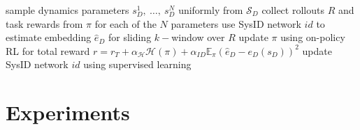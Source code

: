 \documentclass{article}
\newcommand{\E}{\mathbb{E}}
\newcommand{\TODO}[1]{}
\newcommand{\cA}{\mathcal{A}}
\newcommand{\cH}{\mathcal{H}}
\newcommand{\cL}{\mathcal{L}}
\newcommand{\cS}{\mathcal{S}}
\newcommand{\idfn}{id}
\begin{document}

\begin{algorithm}[h]
\caption{\TODO{Name our method.}}
\begin{algorithmic}
  \State sample dynamics parameters $s_D^1,\ \dots,\ s_D^N$ uniformly from $\cS_D$
  \State collect rollouts $R$ and task rewards from $\pi$ for each of the $N$ parameters
  \State use SysID network $\idfn$ to estimate embedding $\hat e_D$ for sliding $k-$window over $R$
  \State update $\pi$ using on-policy RL for total reward $r = r_T + \alpha_{\cH}\cH(\pi) + \alpha_{ID} \E_{\pi} (\hat e_D - e_D(s_D))^2$
  \State update SysID network $\idfn$ using supervised learning
\EndWhile
\end{algorithmic}
\end{algorithm}


\section{Experiments}
\end{document}
